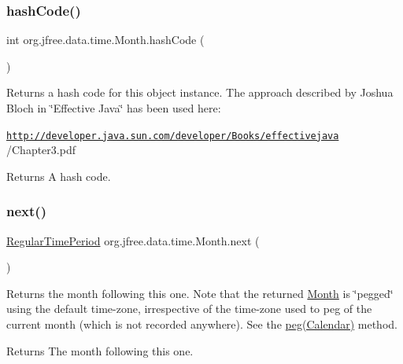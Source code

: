 \subsubsection{\texorpdfstring{hash\+Code()}{hashCode()}}
{\footnotesize\ttfamily int org.\+jfree.\+data.\+time.\+Month.\+hash\+Code (\begin{DoxyParamCaption}{ }\end{DoxyParamCaption})}

Returns a hash code for this object instance. The approach described by Joshua Bloch in \char`\"{}\+Effective Java\char`\"{} has been used here\+: 

{\ttfamily \href{http://developer.java.sun.com/developer/Books/effectivejava}{\tt http\+://developer.\+java.\+sun.\+com/developer/\+Books/effectivejava} /\+Chapter3.pdf}

\begin{DoxyReturn}{Returns}
A hash code. 
\end{DoxyReturn}
\mbox{\label{classorg_1_1jfree_1_1data_1_1time_1_1_month_a9865e73c91ab8fc3209c12c59442361e}} 
\subsubsection{\texorpdfstring{next()}{next()}}
{\footnotesize\ttfamily \mbox{\hyperlink{classorg_1_1jfree_1_1data_1_1time_1_1_regular_time_period}{Regular\+Time\+Period}} org.\+jfree.\+data.\+time.\+Month.\+next (\begin{DoxyParamCaption}{ }\end{DoxyParamCaption})}

Returns the month following this one. Note that the returned \mbox{\hyperlink{classorg_1_1jfree_1_1data_1_1time_1_1_month}{Month}} is \char`\"{}pegged\char`\"{} using the default time-\/zone, irrespective of the time-\/zone used to peg of the current month (which is not recorded anywhere). See the \mbox{\hyperlink{classorg_1_1jfree_1_1data_1_1time_1_1_month_aabe5e5b144b7404d24109c8bee8c5519}{peg(\+Calendar)}} method.

\begin{DoxyReturn}{Returns}
The month following this one. 
\end{DoxyReturn}
\mbox{\label{classorg_1_1jfree_1_1data_1_1time_1_1_month_ac39920155addf2045d3fb8ef877855c4}} 
